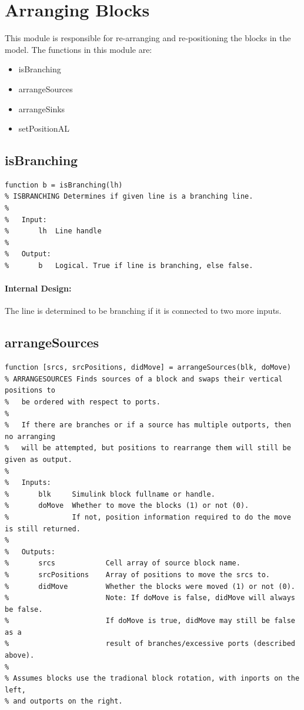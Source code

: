 \documentclass[12pt,letterpaper]{report}
\begin{document}
\section{Arranging  Blocks}
\par This module is responsible for re-arranging and re-positioning the blocks in the model. The functions in this module are:
\begin{itemize}
	\item isBranching
	\item arrangeSources
	\item arrangeSinks
	\item setPositionAL
\end{itemize}

\subsection{isBranching}
\begin{lstlisting}
function b = isBranching(lh)
% ISBRANCHING Determines if given line is a branching line.
%
%   Input:
%       lh  Line handle
%
%   Output:
%       b   Logical. True if line is branching, else false.
\end{lstlisting}
\paragraph{Internal Design:} The line is determined to be branching if it is connected to two more inputs.

\subsection{arrangeSources}
\begin{lstlisting}
function [srcs, srcPositions, didMove] = arrangeSources(blk, doMove)
% ARRANGESOURCES Finds sources of a block and swaps their vertical positions to
%   be ordered with respect to ports.
%
%   If there are branches or if a source has multiple outports, then no arranging
%   will be attempted, but positions to rearrange them will still be given as output.
%
%   Inputs:
%       blk     Simulink block fullname or handle.
%       doMove  Whether to move the blocks (1) or not (0).
%               If not, position information required to do the move is still returned.
%
%   Outputs:
%       srcs            Cell array of source block name.
%       srcPositions    Array of positions to move the srcs to.
%       didMove         Whether the blocks were moved (1) or not (0).
%                       Note: If doMove is false, didMove will always be false.
%                       If doMove is true, didMove may still be false as a
%                       result of branches/excessive ports (described above).
%
% Assumes blocks use the tradional block rotation, with inports on the left,
% and outports on the right.
\end{lstlisting}
\end{document}
